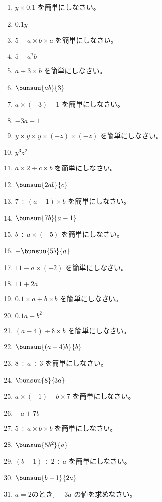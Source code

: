 \documentclass[uplatex,a4j,11pt]{jsreport}
\begin{document}
\begin{multicols}{2}
\begin{enumerate}
    \item $y\times 0.1$ を簡単にしなさい。%
    \item $0.1y$
    \item $5-a\times b\times a$ を簡単にしなさい。%
    \item $5-a^2b$
    \item $a\div 3\times b$ を簡単にしなさい。%
    \item $\bunsuu{ab}{3}$
    \item $a\times (-3)+1$ を簡単にしなさい。%
    \item $-3a+1$
    \item $y\times y\times y\times (-z)\times (-z)$ を簡単にしなさい。%
    \item $y^3z^2$
    \item $a\times 2\div c\times b$ を簡単にしなさい。%
    \item $\bunsuu{2ab}{c}$
    \item $7\div (a-1)\times b$ を簡単にしなさい。%
    \item $\bunsuu{7b}{a-1}$
    \item $b\div a\times (-5)$ を簡単にしなさい。%
    \item $-\bunsuu{5b}{a}$
    \item $11-a\times (-2)$ を簡単にしなさい。%
    \item $11+2a$
    \item $0.1\times a+b\times b$ を簡単にしなさい。%
    \item $0.1a+b^2$
    \item $(a-4)\div 8\times b$ を簡単にしなさい。%
    \item $\bunsuu{(a-4)b}{b}$
    \item $8\div a\div 3$ を簡単にしなさい。%
    \item $\bunsuu{8}{3a}$
    \item $a\times (-1)+b\times 7$ を簡単にしなさい。%
    \item $-a+7b$
    \item $5\div a\times b\times b$ を簡単にしなさい。%
    \item $\bunsuu{5b^2}{a}$
    \item $(b-1)\div 2\div a$ を簡単にしなさい。%
    \item $\bunsuu{b-1}{2a}$
    \item $a=2$のとき，$-3a$ の値を求めなさい。%

\end{enumerate}
\end{multicols}
\end{document}
